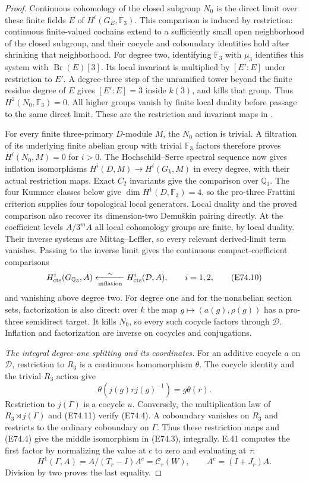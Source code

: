 \begin{proof}
Continuous cohomology of the closed subgroup $N_0$
is the direct limit over these finite fields $E$ of
$H^i(G_E,\mathbb F_3)$. This comparison is induced by
restriction: continuous finite-valued cochains extend
to a sufficiently small open neighborhood of the
closed subgroup, and their cocycle and coboundary
identities hold after shrinking that neighborhood.
For degree two, identifying $\mathbb F_3$ with $\mu_3$
identifies this system with $\operatorname{Br}(E)[3]$.
Its local invariant is multiplied by $[E':E]$ under
restriction to $E'$. A degree-three step of the
unramified tower beyond the finite residue degree
of $E$ gives $[E':E]=3$ inside $k(3)$, and kills
that group. Thus $H^2(N_0,\mathbb F_3)=0$.
All higher groups vanish by finite local duality
before passage to the same direct limit. These
are the restriction and invariant maps in
\cite[I, Theorem2.1 and Corollary2.3]{E_MilneADT}.

For every finite three-primary $D$-module $M$, the
$N_0$ action is trivial. A filtration of its underlying
finite abelian group with trivial $\mathbb F_3$
factors therefore proves $H^i(N_0,M)=0$ for $i>0$.
The Hochschild--Serre spectral sequence now gives
inflation isomorphisms $H^i(D,M)\to H^i(G_k,M)$
in every degree, with their actual restriction maps.
Exact $C_2$ invariants give the comparison over
$\mathbb Q_3$. The four Kummer classes below give
$\dim H^1(D,\mathbb F_3)=4$, so the pro-three
Frattini criterion supplies four topological
local generators. Local duality and the proved
comparison also recover its dimension-two
Demu\v skin pairing directly.
At the coefficient levels $A/3^mA$ all local cohomology
groups are finite, by local duality. Their inverse systems
are Mittag--Leffler, so every relevant derived-limit term
vanishes. Passing to the inverse limit gives the
continuous compact-coefficient comparisons
\[
 H^i_{\rm cts}(G_{\mathbb Q_3},A)
       \xleftarrow[\rm inflation]{\ \sim\ }
 H^i_{\rm cts}(\mathcal D,A),\qquad i=1,2,
 \tag{E74.10}
\]
and vanishing above degree two. For degree one and for
the nonabelian section sets, factorization is also direct:
over $k$ the map $g\mapsto(a(g),\rho(g))$ has a
pro-three semidirect target. It kills $N_0$, so every
such cocycle factors through $\mathcal D$. Inflation and
factorization are inverse on cocycles and conjugations.

\emph{The integral degree-one splitting and its coordinates.}
For an additive cocycle $a$ on $\mathcal D$, restriction
to $R_3$ is a continuous homomorphism $\theta$. The
cocycle identity and the trivial $R_3$ action give
\[
 \theta(j(g)rj(g)^{-1})=g\theta(r).
 \tag{E74.11}
\]
Restriction to $j(\Gamma)$ is a cocycle $u$. Conversely,
the multiplication law of $R_3\rtimes j(\Gamma)$ and
(E74.11) verify (E74.4). A coboundary vanishes on
$R_3$ and restricts to the ordinary coboundary on
$\Gamma$. Thus these restriction maps and (E74.4)
give the middle isomorphism in (E74.3), integrally.
E.41 computes the first factor by normalizing the
value at $c$ to zero and evaluating at $\tau$:
\[
 H^1(\Gamma,A)=A/(T_r-I)A^c=\mathcal C_r(W),
 \qquad A^c=(I+J_r)A.
 \tag{E74.12}
\]
Division by two proves the last equality.


\end{proof}
